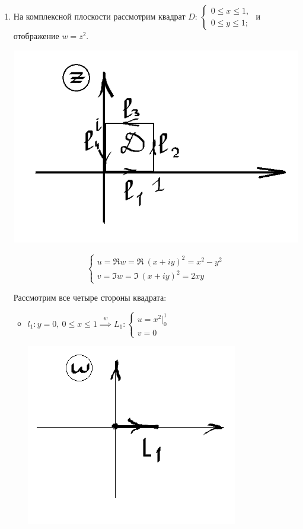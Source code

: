 \documentclass[../../main.tex]{subfiles}
\begin{document}
\begin{examples}
\begin{enumerate}
\[\begin{gathered}
\text{Длина }L \stackrel{\eqref{lec30:1}}{=}
\left[
     f'(z) = \left(z^2\right)' = 2z
\right]
= \int\limits_l{2\abs z \abs{dz}} = 
\left[
  z = 1 + iy,\ y|_{-1}^1
\right]
=\\=
\left[
  \begin{array}{ccc}
     |z| = \sqrt{1 + y^2}\\
     dz = idy \implies |dz| = dy
  \end{array}
\right]
= 2 \int\limits_{-1}^1{\sqrt{1 + y^2}\ dy} = 
4\int\limits_0^1{\sqrt{1 + y^2}\ dy} =\\= 2
\left[
  \sqrt{1 + y^2} + \ln(y + \sqrt{1 + y^2})
\right]_0^1 =
2(\sqrt{2} + \ln(1 + \sqrt{2})).
\end{gathered}\]

\item На комплексной плоскости рассмотрим квадрат $D$:
$\begin{cases}
    0 \leq x \leq 1,\\
    0 \leq y \leq 1;
\end{cases}$ \hspace{-1.1em} и отображение ${w = z^2}$.
\begin{center}
\includegraphics[height=0.3\textwidth]{lec30_3.png}
\end{center}
\[\begin{cases}
u = \Re w = \Re\ (x + iy)^2 = x^2 - y^2 \\
v = \Im w = \Im\ (x + iy)^2 = 2xy
\end{cases}\]

Рассмотрим все четыре стороны квадрата:
\begin{itemize}
\item[а)] $l_1: y = 0,\ 0 \leq x \leq 1 \stackrel{w}{\implies} L_1:
\begin{cases}
    u = x^2\big|_0^1\\
    v = 0
\end{cases}$
\begin{center}
\includegraphics[height=0.3\textwidth]{lec30_4.png}
\end{center}


\end{itemize}
\end{enumerate}
\end{examples}
\end{document}
